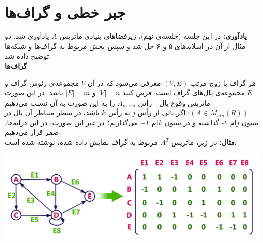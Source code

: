 \chapter{جبر خطی و گراف‌ها}
\textbf{یادآوری:}
در این جلسه (جلسه‌ی نهم)، زیر‌فضا‌های بنیادی ماتریس $A$ یادآوری شد، دو مثال از آن در اسلاید‌های ۵ و ۶ حل شد و سپس بخش مربوط به گراف‌ها و شبکه‌ها توضیح داده شد.\\
\textbf{گراف‌ها}

هر گراف با زوج مرتب $(V,E)$ معرفی می‌شود که در آن $V$ مجموعه‌ی رئوس گراف و $E$ مجموعه‌ی یال‌های گراف است. فرض کنید $|V|=n$ و $|E|=m$ باشد. در این صورت ماتریس وقوع یال - رأس $A_{m\times n}$ را به این صورت به آن نسبت می‌دهیم $(A\in M_{mn}(R))$:
اگر یالی از رأس $j$ به رأس $k$ باشد، در سطر متناظر آن یال در ستون $j$ام ۱- گذاشته و در ستون $k$ام ۱+ می‌گذاریم؛ در غیر این صورت، در این درایه‌ها، صفر قرار می‌دهیم.\\
\textbf{مثال:} در زیر، ماتریس $A^T$ مربوط به گراف نمایش داده شده، نوشته شده است:

\begin{center}
\includegraphics{incidence.jpg}
\end{center}

